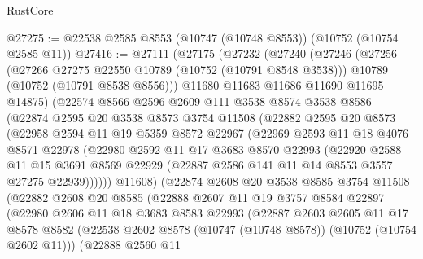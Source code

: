 \begin{lexlean}{RustCore}
\begin{coremodule}
@27275 := @22538 @2585 @8553 (@10747 (@10748 @8553)) (@10752 (@10754 @2585 @11))
@27416 := @27111
    (@27175
      (@27232
        (@27240
          (@27246
            (@27256
              (@27266 @27275 @22550 @10789 (@10752 (@10791 @8548 @3538)))
              @10789
              (@10752 (@10791 @8538 @8556)))
            @11680
            @11683
            @11686
            @11690
            @11695
            @14875)
          (@22574
            @8566
            @2596
            @2609
            @111
            @3538
            @8574
            @3538
            @8586
            (@22874
              @2595
              @20
              @3538
              @8573
              @3754
              @11508
              (@22882
                @2595
                @20
                @8573
                (@22958
                  @2594
                  @11
                  @19
                  @5359
                  @8572
                  @22967
                  (@22969
                    @2593
                    @11
                    @18
                    @4076
                    @8571
                    @22978
                    (@22980
                      @2592
                      @11
                      @17
                      @3683
                      @8570
                      @22993
                      (@22920
                        @2588
                        @11
                        @15
                        @3691
                        @8569
                        @22929
                        (@22887 @2586 @141 @11 @14 @8553 @3557 @27275 @22939))))))
              @11608)
            (@22874
              @2608
              @20
              @3538
              @8585
              @3754
              @11508
              (@22882
                @2608
                @20
                @8585
                (@22888
                  @2607
                  @11
                  @19
                  @3757
                  @8584
                  @22897
                  (@22980
                    @2606
                    @11
                    @18
                    @3683
                    @8583
                    @22993
                    (@22887
                      @2603
                      @2605
                      @11
                      @17
                      @8578
                      @8582
                      (@22538 @2602 @8578 (@10747 (@10748 @8578)) (@10752 (@10754 @2602 @11)))
                      (@22888
                        @2560
                        @11

\end{coremodule}
\end{lexlean}
